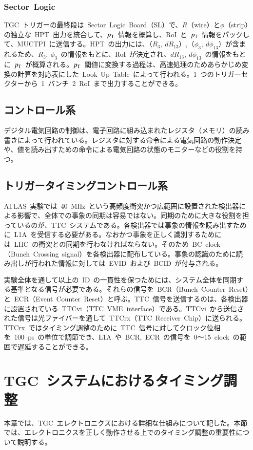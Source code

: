\subsubsection{Sector~Logic}
TGC~トリガーの最終段は~Sector~Logic~Board（SL）で、$R$（wire）と$\phi$（strip）の独立な~HPT~出力を統合して、$p_{\rm{T}}$~情報を概算し、RoI~と~$p_{\rm{T}}$~情報をパックして、MUCTPI~に送信する。HPT~の出力には、（$R_{3},~dR_{13}$）,（$\phi_{3},~d\phi_{13}$）が含まれるため、$R_3,~\phi_3$~の情報をもとに、RoI~が決定され、$dR_{13},~d\phi_{13}$~の情報をもとに~$p_{\rm{T}}$~が概算される。$p_{\rm{T}}$~閾値に変換する過程は、高速処理のためあらかじめ変換の計算を対応表にした~Look~Up~Table~によって行われる。1~つのトリガーセクターから~1~バンチ~2~RoI~まで出力することができる。

\subsection{コントロール系}
デジタル電気回路の制御は、電子回路に組み込まれたレジスタ（メモリ）の読み書きによって行われている。レジスタに対する命令による電気回路の動作決定や、値を読み出すための命令による電気回路の状態のモニターなどの役割を持つ。

\subsection{トリガータイミングコントロール系}
ATLAS~実験では~40~MHz~という高頻度衝突かつ広範囲に設置された検出器による影響で、全体での事象の同期は容易ではない。同期のために大きな役割を担っているのが、TTC~システムである。各検出器では事象の情報を読み出すために~L1A~を受信する必要がある。なおかつ事象を正しく識別するためには~LHC~の衝突との同期を行わなければならない。そのため~BC~clock（Bunch~Crossing~signal）を各検出器に配布している。事象の認識のために読み出しが行われた情報に対しては~EVID~および~BCID~が付与される。

実験全体を通して以上の~ID~の一貫性を保つためには、システム全体を同期する基準となる信号が必要である。それらの信号を~BCR（Bunch~Counter~Reset）と~ECR（Event~Counter~Reset）と呼ぶ。TTC~信号を送信するのは、各検出器に設置されている~TTCvi（TTC~VME~interface）である。TTCvi~から送信された信号は光ファイバーを通して~TTCrx（TTC~Receiver~Chip）に送られる。TTCrx~ではタイミング調整のために~TTC~信号に対してクロック位相を~100~ps~の単位で調節でき、L1A~や~BCR,~ECR~の信号を~0～15~clock~の範囲で遅延することができる。

\section{TGC~システムにおけるタイミング調整}
本章では、TGC~エレクトロニクスにおける詳細な仕組みについて記した。本節では、エレクトロニクスを正しく動作させる上でのタイミング調整の重要性について説明する。

